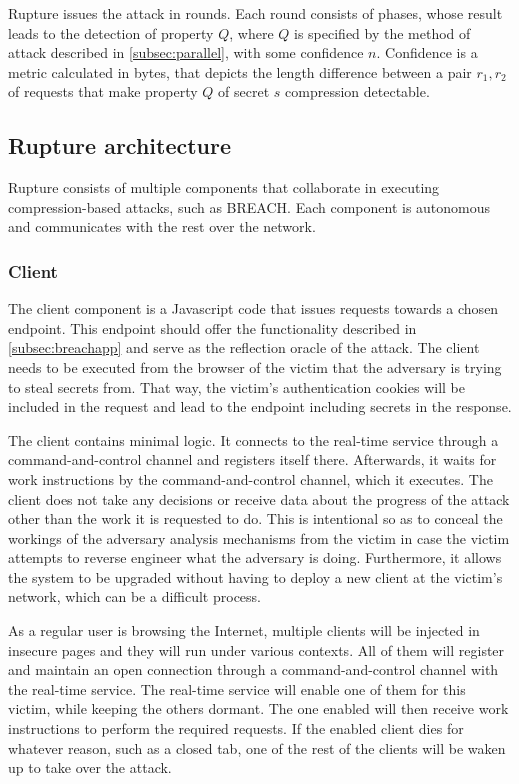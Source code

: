 \documentclass[conference, letterpaper, 10pt]{IEEEtran}
\begin{document}
Rupture issues the attack in rounds. Each round consists of phases, whose result
leads to the detection of property $Q$, where $Q$ is specified by the method of
attack described in \ref{subsec:parallel}, with some confidence $n$. Confidence
is a metric calculated in bytes, that depicts the length difference between a
pair $r_1, r_2$ of requests that make property $Q$ of secret $s$ compression
detectable.

\subsection{Rupture architecture}\label{app:rupture}
Rupture consists of multiple components that collaborate in executing
compression-based attacks, such as BREACH. Each component is autonomous and
communicates with the rest over the network.

\subsubsection{Client}

The client component is a Javascript code that issues requests towards a chosen
endpoint. This endpoint should offer the functionality described in
\ref{subsec:breachapp} and serve as the reflection oracle of the attack. The client
needs to be executed from the browser of the victim that the adversary is trying
to steal secrets from. That way, the victim's authentication cookies will be
included in the request and lead to the endpoint including secrets in the
response.

The client contains minimal logic. It connects to the real-time service through
a command-and-control channel and registers itself there. Afterwards, it waits
for work instructions by the command-and-control channel, which it executes. The
client does not take any decisions or receive data about the progress of the
attack other than the work it is requested to do. This is intentional so as
to conceal the workings of the adversary analysis mechanisms from the victim
in case the victim attempts to reverse engineer what the adversary is doing.
Furthermore, it allows the system to be upgraded without having to deploy a
new client at the victim's network, which can be a difficult process.

As a regular user is browsing the Internet, multiple clients will be
injected in insecure pages and they will run under various contexts. All of
them will register and maintain an open connection through a
command-and-control channel with the real-time service. The real-time
service will enable one of them for this victim, while keeping the others
dormant. The one enabled will then receive work instructions to perform the
required requests. If the enabled client dies for whatever reason, such as a
closed tab, one of the rest of the clients will be waken up to take over the
attack.
\end{document}
